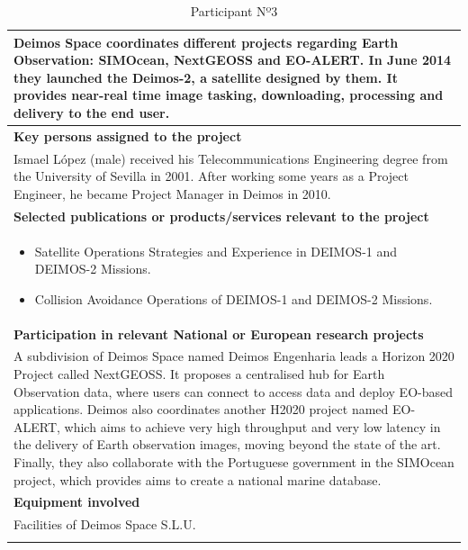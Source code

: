 \begin{longtable}[H]{|p{0.7cm}|p{4cm}|p{7cm}|p{1.3cm}|}
	\multicolumn{4}{|p{14.5cm}|}{Deimos Space coordinates different projects regarding Earth Observation: SIMOcean, NextGEOSS and EO-ALERT. In June 2014 they launched the Deimos-2, a satellite designed by them. It provides near-real time image tasking, downloading, processing and delivery to the end user.}  \\ \hline
	
	\multicolumn{4}{|p{13cm}|}{\textbf{Key persons assigned to the project}}   \\ \hline
	
	\multicolumn{4}{|p{14.5cm}|}{Ismael López (male) received his Telecommunications Engineering degree from the University of Sevilla in 2001. After working some years as a Project Engineer, he became Project Manager in Deimos in 2010. }  \\ \hline
	
	\multicolumn{4}{|p{13cm}|}{\textbf{Selected publications or products/services relevant to the project}}  \\ \hline
	
	\multicolumn{4}{|p{14.5cm}|}{
	\begin{itemize}
		\item Satellite Operations Strategies and Experience in DEIMOS-1 and DEIMOS-2 Missions.
		\item Collision Avoidance Operations of DEIMOS-1 and DEIMOS-2 Missions.
	\end{itemize}	}  \\ \hline
	
	\multicolumn{4}{|p{13cm}|}{\textbf{Participation in relevant National or European research projects}}  \\ \hline
	
	\multicolumn{4}{|p{14.5cm}|}{A subdivision of Deimos Space named Deimos Engenharia leads a Horizon 2020 Project called NextGEOSS. It proposes a centralised hub for Earth Observation data, where users can connect to access data and deploy EO-based applications. Deimos also coordinates another H2020 project named EO-ALERT, which aims to achieve very high throughput and very low latency in the delivery of Earth observation images, moving beyond the state of the art. Finally, they also collaborate with the Portuguese government in the SIMOcean project, which provides aims to create a national marine database.}  \\ \hline
	
	\multicolumn{4}{|p{13cm}|}{\textbf{Equipment involved}}  \\ \hline
	
	\multicolumn{4}{|p{14.5cm}|}{Facilities of Deimos Space S.L.U.}  \\ \hline
	\caption{Participant Nº3}
\end{longtable}

